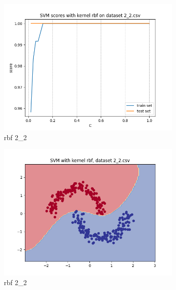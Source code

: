 \documentclass[12pt]{article}
\newcommand*{\subfigwidth}{0.24\textwidth}
\begin{document}
\begin{figure}[H]
\begin{subfigure}[t]{\subfigwidth}
        \includegraphics[width=\linewidth]{img/exp_1/svm/2_2/rbf/scores.png}
        \caption{rbf 2\_2}
    \end{subfigure}
    \hfill
    \begin{subfigure}[t]{\subfigwidth}
        \includegraphics[width=\linewidth]{img/exp_1/svm/2_2/rbf/boundary.png}
        \caption{rbf 2\_2}
    \end{subfigure}
    \\
    \begin{subfigure}[t]{\subfigwidth}

\end{subfigure}
\end{figure}
\end{document}
